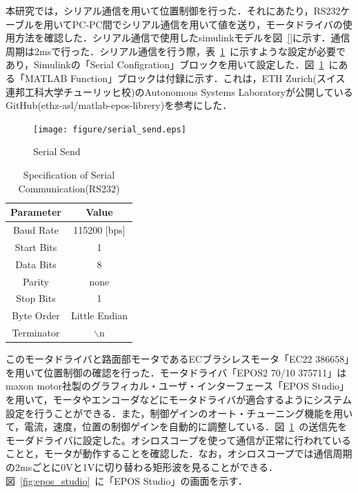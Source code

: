 \documentclass[a4paper,12pt]{article_vdlab_sotsuron}
\begin{document}
\newpage
本研究では，シリアル通信を用いて位置制御を行った．それにあたり，RS232ケーブルを用いてPC-PC間でシリアル通信を用いて値を送り，モータドライバの使用方法を確認した．シリアル通信で使用したsimulinkモデルを図~\ref{}に示す．通信周期は2msで行った．シリアル通信を行う際，表~\ref{tab:serial}~に示すような設定が必要であり，Simulinkの「Serial Configration」ブロックを用いて設定した．図~\ref{fig:serial_send}~にある「MATLAB Function」ブロックは付録に示す．これは，ETH Zurich(スイス連邦工科大学チューリッヒ校)のAutonomous Systems Laboratoryが公開しているGitHub(ethz-asl/matlab-epos-librery)を参考にした．\cite{eth_zurich}

\vspace*{10mm}
\begin{figure}[htp]
  \begin{center}
    \texttt{[image: figure/serial\_send.eps]}
    \vspace*{3mm}
    \caption{Serial Send}
    \label{fig:serial_send}
  \end{center}
\end{figure}

\begin{table}[htp]
  \begin{center}
    \makeatletter
    \def\@captype{table}
    \makeatother
    \caption{Specification of Serial Communication(RS232)}
      \label{tab:serial}
	\begin{tabular}{cc}\hline
	  Parameter & Value\\\hline
	  Baud Rate & 115200 [bps]\\
	  Start Bits & 1\\
	  Data Bits & 8\\
	  Parity & none\\
	  Stop Bits & 1\\
	  Byte Order & Little Endian\\
	  Terminator & $\backslash$n\\\hline
      \end{tabular}
    \end{center}
\end{table}

\newpage
このモータドライバと路面部モータであるECブラシレスモータ「EC22 386658」を用いて位置制御の確認を行った．モータドライバ「EPOS2 70/10 375711」はmaxon motor社製のグラフィカル・ユーザ・インターフェース「EPOS Studio」を用いて，モータやエンコーダなどにモータドライバが適合するようにシステム設定を行うことができる\cite{epos_studio}．また，制御ゲインのオート・チューニング機能を用いて，電流，速度，位置の制御ゲインを自動的に調整している．図~\ref{fig:serial_send}~の送信先をモーダドライバに設定した。オシロスコープを使って通信が正常に行われていることと，モータが動作することを確認した．なお，オシロスコープでは通信周期の2msごとに0Vと1Vに切り替わる矩形波を見ることができる．図~\ref{fig:epos_studio}~に「EPOS Studio」の画面を示す．
\end{document}
